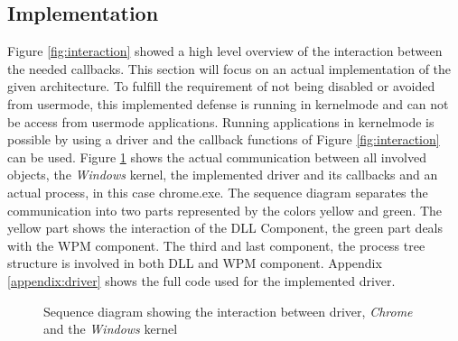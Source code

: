 \subsection{Implementation}
\label{sec:implementation} 
Figure \ref{fig:interaction} showed a high level overview of the interaction between the needed callbacks. This section will focus on an actual implementation of the given architecture. To fulfill the requirement of not being disabled or avoided from usermode, this implemented defense is running in kernelmode and can not be access from usermode applications. Running applications in kernelmode is possible by using a driver and the callback functions of Figure \ref{fig:interaction} can be used. Figure \ref{fig:sequence} shows the actual communication between all involved objects, the \emph{Windows} kernel, the implemented driver and its callbacks and an actual process, in this case chrome.exe. The sequence diagram separates the communication into two parts represented by the colors yellow and green. The yellow part shows the interaction of the \gls{DLL} Component, the green part deals with the \gls{WPM} component. The third and last component, the process tree structure is involved in both \gls{DLL} and \gls{WPM} component. Appendix \ref{appendix:driver} shows the full code used for the implemented driver.
\begin{figure}[htb] 
 \centering
\caption{Sequence diagram showing the interaction between driver, \emph{Chrome} and the \emph{Windows} kernel}
\label{fig:sequence}
\end{figure}
\restoregeometry
